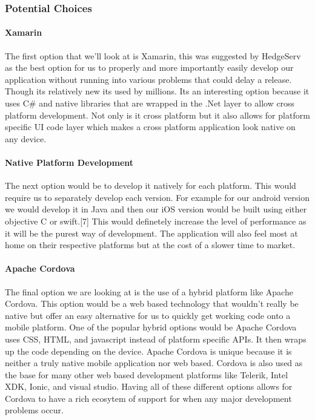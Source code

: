 \documentclass[onecolumn, draftclsnofoot,10pt, compsoc]{IEEEtran}
\begin{document}
\subsubsection{Potential Choices}

\paragraph{Xamarin}
The first option that we'll look at is Xamarin, this was suggested by HedgeServ as the best option for us to properly and more importantly easily develop our application without running into various problems that could delay a release. Though its relatively new its used by millions. Its an interesting option because it uses C\# and native libraries that are wrapped in the .Net layer to allow cross platform development. Not only is it cross platform but it also allows for platform specific UI code layer which makes a cross platform application look native on any device.

\paragraph{Native Platform Development}
The next option would be to develop it natively for each platform. This would require us to separately develop each version. For example for our android version we would develop it in Java and then our iOS version would be built using either objective C or swift.[7] This would definetely increase the level of performance as it will be the purest way of development. The application will also feel most at home on their respective platforms but at the cost of a slower time to market.

\paragraph{Apache Cordova}
The final option we are looking at is the use of a hybrid platform like Apache Cordova. This option would be a web based technology that wouldn't really be native but offer an easy alternative for us to quickly get working code onto a mobile platform. One of the popular hybrid options would be Apache Cordova uses CSS, HTML, and javascript instead of platform specific APIs. It then wraps up the code depending on the device. Apache Cordova is unique because it is neither a truly native mobile application nor web based. Cordova is also used as the base for many other web based development platforms like Telerik, Intel XDK, Ionic, and visual studio. Having all of these different options allows for Cordova to have a rich ecosytem of support for when any major development problems occur.
\end{document}

